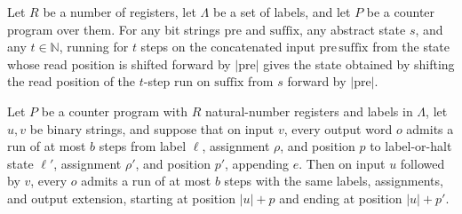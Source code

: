 \begin{theorem}
\label{Complexity.CounterProg.run_shiftInput}
\leanok
{}
Let $R$ be a number of registers, let $\Lambda$ be a set of labels, and let $P$ be a
counter program over them. For any bit strings $\mathrm{pre}$ and $\mathrm{suffix}$, any
abstract state $s$, and any $t\in\mathbb{N}$, running for $t$ steps on the concatenated
input $\mathrm{pre}\,\mathrm{suffix}$ from the state whose read position is shifted
forward by $|\mathrm{pre}|$ gives the state obtained by shifting the read position of
the $t$-step run on $\mathrm{suffix}$ from $s$ forward by $|\mathrm{pre}|$.
\end{theorem}

\begin{theorem}
\label{Complexity.CounterProg.Goes.prepend_input}
\leanok
{}
Let $P$ be a counter program with $R$ natural-number registers and labels in $\Lambda$,
let $u,v$ be binary strings, and suppose that on input $v$, every output word $o$ admits
a run of at most $b$ steps from label $\ell$, assignment $\rho$, and position $p$ to
label-or-halt state $\ell'$, assignment $\rho'$, and position $p'$, appending $e$. Then
on input $u$ followed by $v$, every $o$ admits a run of at most $b$ steps with the same
labels, assignments, and output extension, starting at position $|u|+p$ and ending at
position $|u|+p'$.
\end{theorem}
